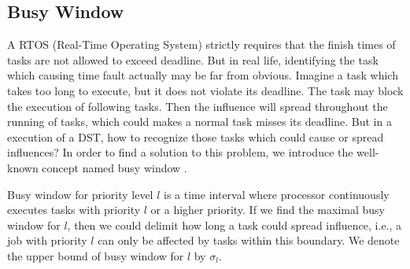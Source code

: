 \documentclass[10pt,conference]{IEEEtran}
\begin{document}
\subsection{Busy Window}\label{section_busywindow}

A RTOS (Real-Time Operating System) strictly requires that the finish times of tasks are not allowed to exceed deadline. But in real life, identifying the task which causing time fault actually may be far from obvious. Imagine a task which takes too long to execute, but it does not violate its deadline. The task may block the execution of following tasks. Then the influence will spread throughout the running of tasks, which could makes a normal task misses its deadline. But in a execution of a DST, how to recognize those tasks which could cause or spread influences? 
In order to find a solution to this problem, we introduce the well-known concept named busy window \cite{DBLP:conf/rtss/Lehoczky90}. 

Busy window for priority level $l$ is a time interval where processor continuously executes tasks with priority $l$ or a higher priority. If we find the maximal busy window for $l$, then we could delimit how long a task could spread influence, i.e., a job with priority $l$ can only be affected by tasks within this boundary. We denote the upper bound of busy window for $l$ by $\sigma_l$.
\end{document}
